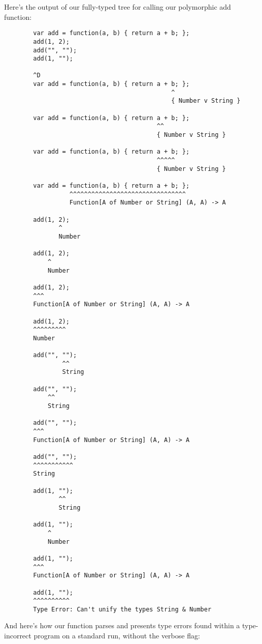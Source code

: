 \documentclass[british, twoside]{bhamthesis}
\theoremstyle{definition}
\begin{document}
      Here's the output of our fully-typed tree for calling our polymorphic add function:
      \begin{lstlisting}
        var add = function(a, b) { return a + b; };
        add(1, 2);
        add("", "");
        add(1, "");

        ^D
        var add = function(a, b) { return a + b; };
                                              ^
                                              { Number v String }

        var add = function(a, b) { return a + b; };
                                          ^^
                                          { Number v String }

        var add = function(a, b) { return a + b; };
                                          ^^^^^
                                          { Number v String }

        var add = function(a, b) { return a + b; };
                  ^^^^^^^^^^^^^^^^^^^^^^^^^^^^^^^^
                  Function[A of Number or String] (A, A) -> A

        add(1, 2);
               ^
               Number

        add(1, 2);
            ^
            Number

        add(1, 2);
        ^^^
        Function[A of Number or String] (A, A) -> A

        add(1, 2);
        ^^^^^^^^^
        Number

        add("", "");
                ^^
                String

        add("", "");
            ^^
            String

        add("", "");
        ^^^
        Function[A of Number or String] (A, A) -> A

        add("", "");
        ^^^^^^^^^^^
        String

        add(1, "");
               ^^
               String

        add(1, "");
            ^
            Number

        add(1, "");
        ^^^
        Function[A of Number or String] (A, A) -> A

        add(1, "");
        ^^^^^^^^^^
        Type Error: Can't unify the types String & Number
      \end{lstlisting}

      And here's how our function parses and presents type errors found within a type-incorrect program on a standard run, without the verbose flag:
\end{document}

